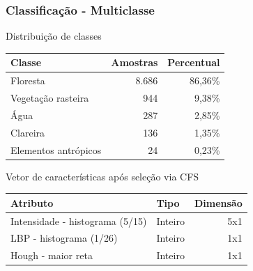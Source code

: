 \documentclass[t]{beamer}
\begin{document}
\begin{frame}[c]
	\frametitle{Classificação - Multiclasse}

	\centering
	Distribuição de classes

	\small{
	\begin{table}[h]
	\centering
	\begin{tabulary}{\linewidth}{|L|R|R|}
		\hline
		\textbf{Classe} & \textbf{Amostras} & \textbf{Percentual} \\ \hline
		Floresta             & 8.686 & 86,36\% \\ \hline
		Vegetação rasteira   & 944   &  9,38\% \\ \hline
		Água                 & 287   &  2,85\% \\ \hline
		Clareira             & 136   &  1,35\% \\ \hline
		Elementos antrópicos & 24    &  0,23\% \\ \hline
	\end{tabulary}
	\end{table}
	}

	\centering
	Vetor de características após seleção via CFS

	\small{
	\begin{table}[h]
	\centering
	\begin{tabulary}{\linewidth}{|L|L|R|}
	\hline
	\textbf{Atributo} & \textbf{Tipo} & \textbf{Dimensão} \\ \hline
	Intensidade - histograma (5/15) & Inteiro & 5x1 \\ \hline
	LBP - histograma (1/26)         & Inteiro & 1x1 \\ \hline
	Hough - maior reta              & Inteiro & 1x1 \\ \hline
	\end{tabulary}
	\end{table}
	}
\end{frame}
\end{document}
